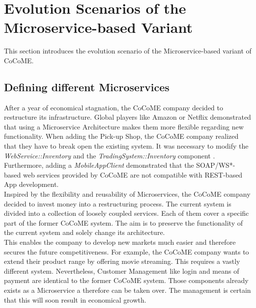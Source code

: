 
\section{Evolution Scenarios of the Microservice-based Variant}
This section introduces the evolution scenario of the Microservice-based variant of
CoCoME.
\subsection{Defining different Microservices}
After a year of economical stagnation, the CoCoME company decided to restructure its infrastructure. Global players like Amazon or Netflix demonstrated that using a Microservice Architecture makes them more flexible regarding new functionality. When adding the Pick-up Shop, the CoCoME company realized that they have to break open the existing system. It was necessary to modify the \textit{WebService::Inventory} and the \textit{TradingSystem::Inventory} component \cite{SWB-469002735}. Furthermore, adding a \textit{MobileAppClient} demonstrated that the SOAP/WS*-based web services provided by CoCoME are not compatible with REST-based App development.
\\
Inspired by the flexibility and reusability of Microservices, the CoCoME company decided to invest money into a restructuring process. The current system is divided into a collection of loosely coupled services. Each of them cover a specific part of the former CoCoME system. The aim is to preserve the functionality of the current system and solely change its architecture.
\\
 This enables the company to develop new markets much easier and therefore secures the future competitiveness. For example, the CoCoME company wants to extend their product range by offering movie streaming. This requires a vastly different system. Nevertheless, Customer Management like login and means of payment are identical to the former CoCoME system. Those components already exists as a Microservice a therefore can be taken over. The management is certain that this will soon result in economical growth.








	
	
